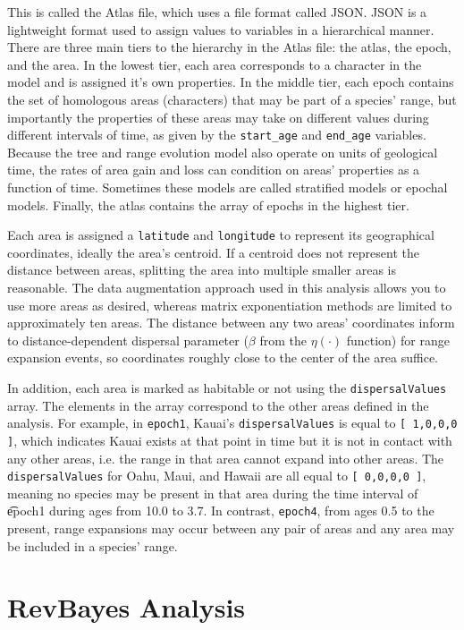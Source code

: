 \documentclass[11pt]{article}
\begin{document}
This is called the Atlas file, which uses a file format called JSON.
JSON is a lightweight format used to assign values to variables in a hierarchical manner.
There are three main tiers to the hierarchy in the Atlas file: the atlas, the epoch, and the area.
In the lowest tier, each area corresponds to a character in the model and is assigned it's own properties.
In the middle tier, each epoch contains the set of homologous areas (characters) that may be part of a species' range, but importantly the properties of these areas may take on different values during different intervals of time, as given by the {\tt start\_age} and {\tt end\_age} variables.
Because the tree and range evolution model also operate on units of geological time, the rates of area gain and loss can condition on areas' properties as a function of time.
Sometimes these models are called stratified models or epochal models.
Finally, the atlas contains the array of epochs in the highest tier.

Each area is assigned a {\tt latitude} and {\tt longitude} to represent its geographical coordinates, ideally the area's centroid.
If a centroid does not represent the distance between areas, splitting the area into multiple smaller areas is reasonable.
The data augmentation approach used in this analysis allows you to use more areas as desired, whereas matrix exponentiation methods are limited to approximately ten areas.
The distance between any two areas' coordinates inform to distance-dependent dispersal parameter ($\beta$ from the $\eta(\cdot)$ function) for range expansion events, so coordinates roughly close to the center of the area suffice.

In addition, each area is marked as habitable or not using the {\tt dispersalValues} array.
The elements in the array correspond to the other areas defined in the analysis.
For example, in {\tt epoch1}, Kauai's {\tt dispersalValues} is equal to {\tt [ 1,0,0,0 ]}, which indicates Kauai exists at that point in time but it is not in contact with any other areas, i.e. the range in that area cannot expand into other areas.
The {\tt dispersalValues} for Oahu, Maui, and Hawaii are all equal to {\tt [ 0,0,0,0 ]}, meaning no species may be present in that area during the time interval of {\t epoch1} during ages from 10.0 to 3.7. In contrast, {\tt epoch4}, from ages 0.5 to the present, range expansions may occur between any pair of areas and any area may be included in a species' range.

\section{RevBayes Analysis}
\end{document}
